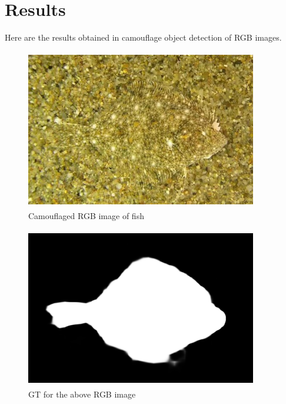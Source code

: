 \vspace{1cm}
\section{{{\fontsize{17}{21}\selectfont \textbf{Results}}}}
\setlength{\columnsep}{1.5cm}
Here are the results obtained in camouflage object detection of RGB images.
\vspace{0.5cm}
\begin{figure}[h]
  \centering
  \includegraphics[width=0.9\textwidth,height=7cm]{sections/LBP/camourflage_00012.jpg}
  \caption{Camouflaged RGB image of fish}
  \label{fig:figure_label}
\end{figure}
\vspace{0.5cm}
\begin{figure}[h]
  \centering
  \includegraphics[width=0.9\textwidth,height=7cm]{sections/LBP/camourflage_00012.png}
  \caption{GT for the above RGB image}
  \label{fig:figure_label}
\end{figure}
\vspace{1cm}
